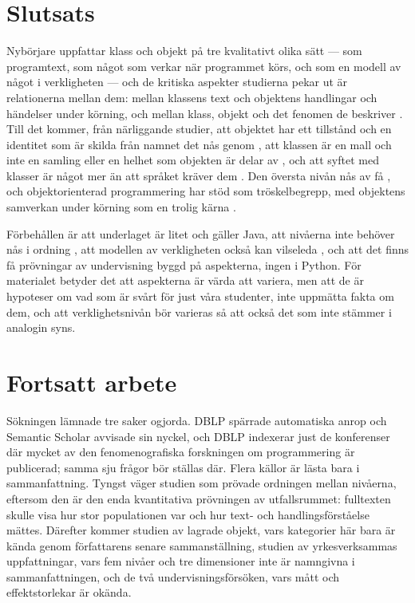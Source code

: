 \section{Slutsats}
\label{sec:fen-slutsats}

Nybörjare uppfattar klass och objekt på tre kvalitativt olika sätt ---
som programtext, som något som verkar när programmet körs, och som en
modell av något i verkligheten --- och de kritiska aspekter studierna
pekar ut är relationerna mellan dem: mellan klassens text och objektens
handlingar och händelser under körning, och mellan klass, objekt och det
fenomen de beskriver \autocite{EckerdalThune2005,Eckerdal2006Lic}.  Till
det kommer, från närliggande studier, att objektet har ett tillstånd och
en identitet som är skilda från namnet det nås genom
\autocite{Sorva2007,Sorva2008}, att klassen är en mall och inte en
samling eller en helhet som objekten är delar av
\autocite{TeifHazzan2006,Sanders2008ConceptMaps,ShmalloRagonisGinat2012},
och att syftet med
klasser är något mer än att språket kräver dem
\autocite{Eckerdal2006Lic}.  Den översta nivån nås av få
\autocite{Eckerdal2009PhD,Xinogalos2015,Sanders2008ConceptMaps}, och
objektorienterad programmering har stöd som tröskelbegrepp, med
objektens samverkan under körning som en trolig kärna
\autocite{Boustedt2007Threshold,Sorva2010Threshold}.

Förbehållen är att underlaget är litet och gäller Java, att nivåerna inte
behöver nås i ordning \autocite{Eckerdal2011TextAction}, att modellen av
verkligheten också kan vilseleda \autocite{TeifHazzan2006,Liberman2011,%
Hadar2013}, och att det finns få prövningar av undervisning byggd på
aspekterna, ingen i Python.  För materialet betyder det att aspekterna är
värda att variera, men att de är hypoteser om vad som är svårt för just
våra studenter, inte uppmätta fakta om dem, och att verklighetsnivån bör
varieras så att också det som inte stämmer i analogin syns.

\section{Fortsatt arbete}
\label{sec:fen-fortsatt}

Sökningen lämnade tre saker ogjorda.  DBLP spärrade automatiska anrop och
Semantic Scholar avvisade sin nyckel, och DBLP indexerar just de
konferenser där mycket av den fenomenografiska forskningen om programmering
är publicerad; samma sju frågor bör ställas där.  Flera källor är lästa
bara i sammanfattning.  Tyngst väger studien som prövade ordningen mellan
nivåerna\autocite{Eckerdal2011TextAction}, eftersom den är den enda
kvantitativa prövningen av utfallsrummet: fulltexten skulle visa hur stor
populationen var och hur text- och handlingsförståelse mättes.  Därefter
kommer studien av lagrade objekt\autocite{Sorva2007}, vars kategorier
här bara är kända genom författarens senare sammanställning, studien av
yrkesverksammas uppfattningar\autocite{ThompsonKinshuk2011}, vars fem
nivåer och tre dimensioner inte är namngivna i sammanfattningen, och de
två undervisningsförsöken\autocite{Chang2012VT,Lee2020VT}, vars mått och
effektstorlekar är okända.

